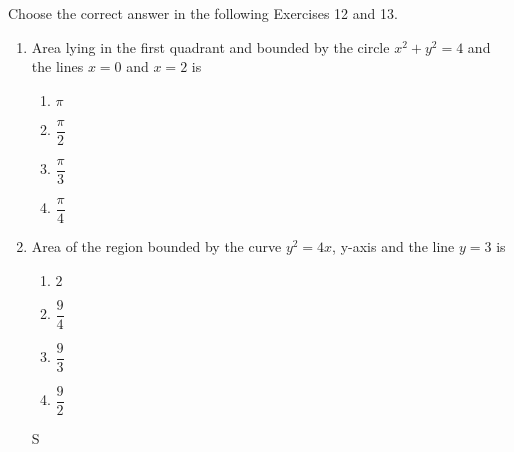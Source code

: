 \documentclass[journal,12pt,twocolumn]{IEEEtran}
\begin{document}
Choose the correct answer in the following   Exercises 12 and 13.
\begin{enumerate} [resume]
\item Area lying in the first quadrant and bounded by the circle ${x}^2 + {y}^2 = 4$ and the lines ${x} = 0$ and ${x} = 2$ is \break

\begin{enumerate}
\item $\pi$
\item $\dfrac{\pi}{2}$
\item $\dfrac{\pi}{3}$  
\item $\dfrac{\pi}{4}$
\end{enumerate}


\item Area of the region bounded by the curve ${y}^2 = 4{x}$, y-axis and the line ${y} = 3$ is

\begin{enumerate}
\item $2$
\item $\dfrac{9}{4}$
\item $\dfrac{9}{3}$  
\item $\dfrac{9}{2}$
\end{enumerate}S

\end{enumerate}
\end{document}
